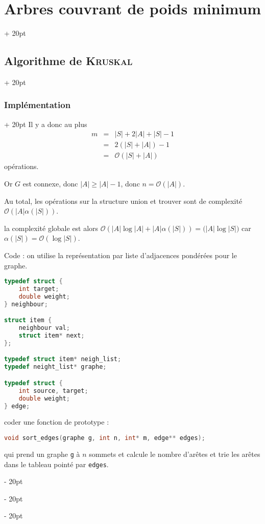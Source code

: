 \documentclass[a4paper, 12pt, twoside]{article}
\newcommand{\abs}[1]{\left\lvert #1 \right\rvert}
\renewcommand{\ge}{\geqslant}
\newcommand{\ind}[1][20pt]{\advance\leftskip + #1}
\newcommand{\deind}[1][20pt]{\advance\leftskip - #1}
\newenvironment{indt}[2][20pt]{#2 \par \ind[#1]}{\par \deind} %
\begin{document}
\begin{indt}{\section{Arbres couvrant de poids minimum}}
\begin{indt}{\subsection{Algorithme de \textsc{Kruskal}}}
\begin{indt}{\subsubsection{Implémentation}}
                Il y a donc au plus
                \[
                    \begin{array}{rcl}
                        m
                        &=&
                        \abs S + 2\abs A + \abs S - 1
                        \\
                        &=& 2(\abs S + \abs A) - 1
                        \\
                        &=& \mathcal O(\abs S + \abs A)
                    \end{array}
                \]
                opérations.

                Or $G$ est connexe, donc $\abs A \ge \abs A - 1$, donc $n = \mathcal O(\abs A)$.

                Au total, les opérations sur la structure union et trouver sont de complexité $\mathcal O(\abs A \alpha(\abs S))$.

                la complexité globale est alors $\mathcal O(\abs A \log \abs A + \abs A \alpha(\abs S)) = \mathcal(\abs A \log \abs S)$ car $\alpha(\abs S) = \mathcal O(\log \abs S)$.

                \vspace{12pt}
                
                Code : on utilise la représentation par liste d'adjacences pondérées pour le graphe.

                \begin{lstlisting}[language=C, xleftmargin=80pt]
typedef struct {
    int target;
    double weight;
} neighbour;

struct item {
    neighbour val;
    struct item* next;
};

typedef struct item* neigh_list;
typedef neight_list* graphe;

typedef struct {
    int source, target;
    double weight;
} edge;\end{lstlisting}

                \vspace{12pt}
                
                 coder une fonction de prototype :
                \begin{lstlisting}[language=C, xleftmargin=80pt]
void sort_edges(graphe g, int n, int* m, edge** edges);\end{lstlisting}

                qui prend un graphe \texttt g à $n$ sommets et calcule le nombre d'arêtes et trie les arêtes dans le tableau pointé par \texttt{edges}.


\end{indt}
\end{indt}
\end{indt}
\end{document}

